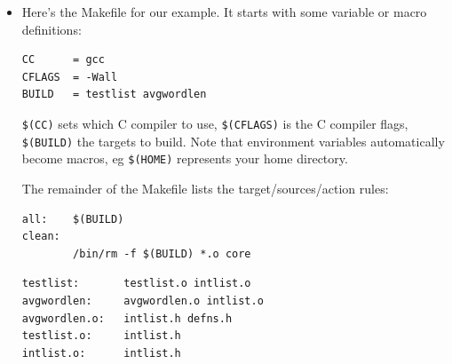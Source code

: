 \documentclass[aspectratio=169]{beamer}
\begin{document}
\begin{frame}[fragile]

\begin{itemize}
\item
    Here's the Makefile for our example.  It starts with some \alert{variable} or \alert{macro}
    definitions:
\small
\begin{verbatim}
CC      = gcc
CFLAGS  = -Wall
BUILD   = testlist avgwordlen
\end{verbatim}

\verb+$(CC)+ sets which C compiler to use,
\verb+$(CFLAGS)+ is the C compiler flags, \verb+$(BUILD)+ the targets to build.
Note that environment variables automatically become macros, eg \verb+$(HOME)+
represents your home directory.

\pitem
The remainder of the Makefile lists the target/sources/action rules:

\begin{verbatim}
all:    $(BUILD)
clean:
        /bin/rm -f $(BUILD) *.o core
\end{verbatim}

\pause
\begin{verbatim}
testlist:       testlist.o intlist.o
avgwordlen:     avgwordlen.o intlist.o
avgwordlen.o:   intlist.h defns.h
testlist.o:     intlist.h
intlist.o:      intlist.h
\end{verbatim}

\end{itemize}

\end{frame}
\end{document}
